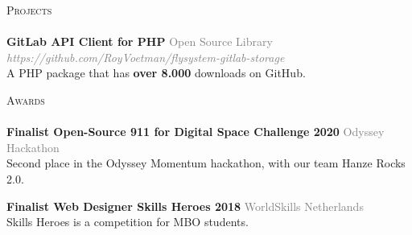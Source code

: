 \documentclass[a4paper]{article}
\newcommand{\lineunder} {
    \vspace*{-8pt} \\
    \hspace*{-18pt} \hrulefill \\
}
\newcommand{\header} [1] {
    {\hspace*{-18pt}\vspace*{6pt} \textsc{#1}}
    \vspace*{-6pt} \lineunder
}
\begin{document}
\vspace{5mm}

\header{Projects}

{\textbf{GitLab API Client for PHP}} \hfill \textcolor{gray}{Open Source Library}\\
\textcolor{gray}{\emph{https://github.com/RoyVoetman/flysystem-gitlab-storage}}\\
A PHP package that has \textbf{over 8.000} downloads on GitHub.
\vspace*{2mm}

\vspace{2mm}

\vspace{5mm}

\header{Awards}
\textbf{Finalist Open-Source 911 for Digital Space Challenge 2020} \hfill \textcolor{gray}{Odyssey Hackathon}\\
Second place in the Odyssey Momentum hackathon, with our team Hanze Rocks 2.0.
\vspace*{2mm}

\textbf{Finalist Web Designer Skills Heroes 2018} \hfill \textcolor{gray}{WorldSkills Netherlands}\\
Skills Heroes is a competition for MBO students.
\vspace*{2mm}

\ 
\end{document}
